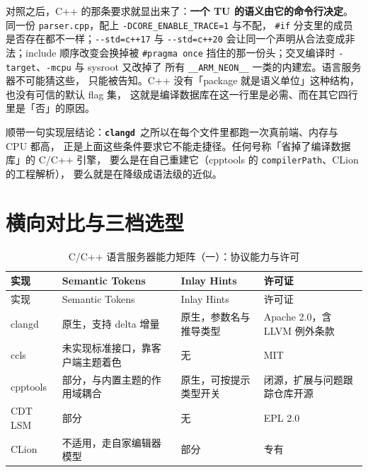 \documentclass[12pt,a4paper,fontset=fandol]{ctexbook}
\newcommand{\Opt}[1]{\texttt{-\/-#1}}
\newcommand{\Lib}[1]{\textbf{\texttt{#1}}}
\newcommand{\CD}{\Lib{clangd}}
\begin{document}
对照之后，C++ 的那条要求就显出来了：\textbf{一个 TU 的语义由它的命令行决定}。
同一份 \texttt{parser.cpp}，配上 \texttt{-DCORE\_ENABLE\_TRACE=1} 与不配，
\texttt{\#if} 分支里的成员是否存在都不一样；\Opt{std=c++17} 与 \Opt{std=c++20}
会让同一个声明从合法变成非法；include 顺序改变会换掉被 \texttt{\#pragma once}
挡住的那一份头；交叉编译时 \texttt{-target}、\texttt{-mcpu} 与 sysroot 又改掉了
所有 \texttt{\_\_ARM\_NEON\_\_} 一类的内建宏。语言服务器不可能猜这些，
只能被告知。C++ 没有「package 就是语义单位」这种结构，也没有可信的默认 flag 集，
这就是编译数据库在这一行里是必需、而在其它四行里是「否」的原因。

顺带一句实现层结论：\CD\ 之所以在每个文件里都跑一次真前端、内存与 CPU 都高，
正是上面这些条件要求它不能走捷径。任何号称「省掉了编译数据库」的 C/C++ 引擎，
要么是在自己重建它（cpptools 的 \texttt{compilerPath}、CLion 的工程解析），
要么就是在降级成语法级的近似。

\section{横向对比与三档选型}\label{sec:ch06-s6}

{\small\setlength{\tabcolsep}{3pt}
\begin{longtable}{>{\raggedright\arraybackslash}p{} >{\raggedright\arraybackslash}p{} >{\raggedright\arraybackslash}p{} >{\raggedright\arraybackslash}p{}}
\caption{C/C++ 语言服务器能力矩阵（一）：协议能力与许可}\label{tab:ch06-cap}\\
\toprule
实现 & Semantic Tokens & Inlay Hints & 许可证 \\
\midrule
\endfirsthead
\toprule
实现 & Semantic Tokens & Inlay Hints & 许可证 \\
\midrule
\endhead
\bottomrule
\endfoot
clangd & 原生，支持 delta 增量 & 原生，参数名与推导类型 & Apache 2.0，含 LLVM 例外条款 \\
ccls & 未实现标准接口，靠客户端主题着色 & 无 & MIT \\
cpptools & 部分，与内置主题的作用域耦合 & 原生，可按提示类型开关 & 闭源，扩展与问题跟踪仓库开源 \\
CDT LSM & 部分 & 无 & EPL 2.0 \\
CLion & 不适用，走自家编辑器模型 & 部分 & 专有 \\
\end{longtable}}
\end{document}
